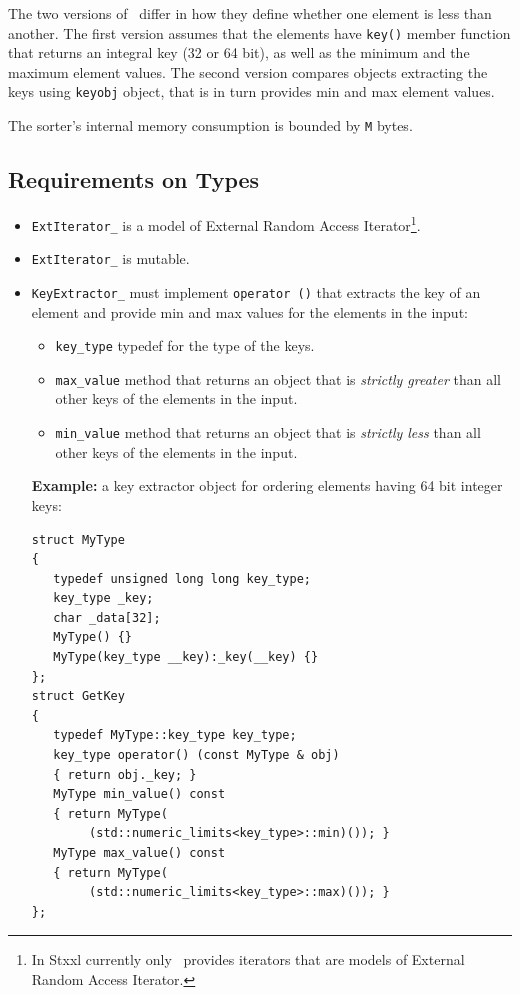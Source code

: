 \documentclass[twoside]{book}
\newcommand{\stxxl}{{\sc Stxxl} }
\begin{document}
The two versions of \xksort\ differ in how they define whether one
element is less than another. The first version assumes that 
the elements have \texttt{key()} member function that returns an
integral key (32 or 64 bit), as well as the minimum and the maximum
element values. The second version compares objects extracting the
keys using \texttt{keyobj} object, that is in turn provides min and
max element values.

The sorter's internal memory consumption is bounded by \texttt{M}
bytes. 

\subsection*{Requirements on Types}

\begin{itemize}
\item \texttt{ExtIterator\_} is a model of External Random Access
Iterator\footnote{In \stxxl currently only \xvector\ provides
iterators that are models of External Random Access Iterator.}. 
\item \texttt{ExtIterator\_} is mutable.
\item \texttt{KeyExtractor\_} must implement \texttt{operator ()} that
extracts the key of an element and provide min and max values for the
elements in the input: 
 \begin{itemize}
 \item \texttt{key\_type} typedef for the type of the keys.
 \item \texttt{max\_value} method that returns an object that is
   \emph{strictly greater} than all other keys of the elements in the
   input.  
 \item \texttt{min\_value} method that returns an object that
    is \emph{strictly less} than all other keys of the elements in the
    input.
 \end{itemize}
 {\bf Example:} 
  a key extractor object for ordering elements having 64 bit integer keys:
\begin{lstlisting}
struct MyType
{
   typedef unsigned long long key_type;
   key_type _key;
   char _data[32];
   MyType() {}
   MyType(key_type __key):_key(__key) {}
};
struct GetKey
{
   typedef MyType::key_type key_type;
   key_type operator() (const MyType & obj)
   { return obj._key; }
   MyType min_value() const 
   { return MyType(
        (std::numeric_limits<key_type>::min)()); }
   MyType max_value() const 
   { return MyType(
        (std::numeric_limits<key_type>::max)()); }
};
 \end{lstlisting}


\end{itemize}
\end{document}
